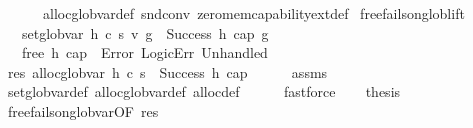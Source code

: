 \begin{isabellebody}
\ \ \ \ \ \ alloc{\isacharunderscore}{\kern0pt}glob{\isacharunderscore}{\kern0pt}var{\isacharunderscore}{\kern0pt}def\ snd{\isacharunderscore}{\kern0pt}conv\ zero{\isacharunderscore}{\kern0pt}mem{\isacharunderscore}{\kern0pt}capability{\isacharunderscore}{\kern0pt}ext{\isacharunderscore}{\kern0pt}def{\isacharparenright}{\kern0pt}%
\endisatagproof
{\isafoldproof}%
%
\isadelimproof
\isanewline
%
\endisadelimproof
\isanewline
{}\isamarkupfalse%
\ free{\isacharunderscore}{\kern0pt}fails{\isacharunderscore}{\kern0pt}on{\isacharunderscore}{\kern0pt}glob{\isacharunderscore}{\kern0pt}lift{\isacharcolon}{\kern0pt}\isanewline
\ \ \ {\isachardoublequoteopen}set{\isacharunderscore}{\kern0pt}glob{\isacharunderscore}{\kern0pt}var\ h\ c\ s\ v\ g\ {\isacharequal}{\kern0pt}\ Success\ {\isacharparenleft}{\kern0pt}h{\isacharprime}{\kern0pt}{\isacharcomma}{\kern0pt}\ cap{\isacharcomma}{\kern0pt}\ g{\isacharprime}{\kern0pt}{\isacharparenright}{\kern0pt}{\isachardoublequoteclose}\isanewline
\ \ \ {\isachardoublequoteopen}free\ h{\isacharprime}{\kern0pt}\ cap\ {\isacharequal}{\kern0pt}\ Error\ {\isacharparenleft}{\kern0pt}LogicErr\ {\isacharparenleft}{\kern0pt}Unhandled\ {}{\isacharparenright}{\kern0pt}{\isacharparenright}{\kern0pt}{\isachardoublequoteclose}\isanewline
%
\isadelimproof
%
\endisadelimproof
%
\isatagproof
{}\isamarkupfalse%
\ {\isacharminus}{\kern0pt}\isanewline
\ \ \isamarkupfalse%
\ res{\isacharcolon}{\kern0pt}\ {\isachardoublequoteopen}alloc{\isacharunderscore}{\kern0pt}glob{\isacharunderscore}{\kern0pt}var\ h\ c\ s\ {\isacharequal}{\kern0pt}\ Success\ {\isacharparenleft}{\kern0pt}h{\isacharprime}{\kern0pt}{\isacharcomma}{\kern0pt}\ cap{\isacharparenright}{\kern0pt}{\isachardoublequoteclose}\isanewline
\ \ \ \ \isamarkupfalse%
\ assms\ \isanewline
\ \ \ \ \isamarkupfalse%
\ set{\isacharunderscore}{\kern0pt}glob{\isacharunderscore}{\kern0pt}var{\isacharunderscore}{\kern0pt}def\ alloc{\isacharunderscore}{\kern0pt}glob{\isacharunderscore}{\kern0pt}var{\isacharunderscore}{\kern0pt}def\ alloc{\isacharunderscore}{\kern0pt}def\isanewline
\ \ \ \ \isamarkupfalse%
\ fastforce\isanewline
\ \ \isamarkupfalse%
\ {\isacharquery}{\kern0pt}thesis\ \isamarkupfalse%
\ free{\isacharunderscore}{\kern0pt}fails{\isacharunderscore}{\kern0pt}on{\isacharunderscore}{\kern0pt}glob{\isacharunderscore}{\kern0pt}var{\isacharbrackleft}{\kern0pt}OF\ res{\isacharbrackright}{\kern0pt}\isanewline
\ \ \ \ \isamarkupfalse%

\end{isabellebody}
